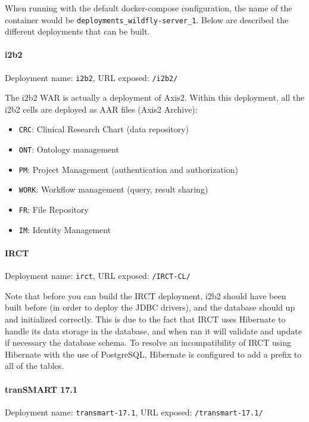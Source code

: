 When running with the default docker-compose configuration, the name of the container would be \verb|deployments_wildfly-server_1|.
Below are described the different deployments that can be built.

\paragraph{i2b2}
Deployment name: \verb|i2b2|, URL exposed: \verb|/i2b2/|

The i2b2 WAR is actually a deployment of Axis2. Within this deployment, all the i2b2 cells are deployed as AAR files (Axis2 Archive):

\begin{itemize}
    \item \verb|CRC|: Clinical Research Chart (data repository)
    \item \verb|ONT|: Ontology management
    \item \verb|PM|: Project Management (authentication and authorization)
    \item \verb|WORK|: Workflow management (query, result sharing)
    \item \verb|FR|: File Repository
    \item \verb|IM|: Identity Management
\end{itemize}

\paragraph{IRCT}
Deployment name: \verb|irct|, URL exposed: \verb|/IRCT-CL/|

Note that before you can build the IRCT deployment, i2b2 should have been built before (in order to deploy the JDBC drivers), and the database should up and initialized correctly.
This is due to the fact that IRCT uses Hibernate to handle its data storage in the database, and when ran it will validate and update if necessary the database schema.
To resolve an incompatibility of IRCT using Hibernate with the use of PostgreSQL, Hibernate is configured to add a prefix to all of the tables.

\paragraph{tranSMART 17.1}
Deployment name: \verb|transmart-17.1|, URL exposed: \verb|/transmart-17.1/|




